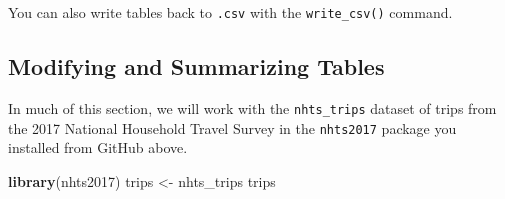 \documentclass[]{book}
\newenvironment{Shaded}{\begin{snugshade}}{\end{snugshade}}
\newcommand{\KeywordTok}[1]{\textcolor[rgb]{0.13,0.29,0.53}{\textbf{#1}}}
\newcommand{\NormalTok}[1]{#1}
\newcommand{\StringTok}[1]{\textcolor[rgb]{0.31,0.60,0.02}{#1}}
\begin{document}
You can also write tables back to \texttt{.csv} with the \texttt{write\_csv()} command.

\hypertarget{modifying-and-summarizing-tables}{%
\subsection{Modifying and Summarizing Tables}\label{modifying-and-summarizing-tables}}

In much of this section, we will work with the \texttt{nhts\_trips} dataset of trips
from the 2017 National Household Travel Survey in the \texttt{nhts2017} package you
installed from GitHub above.

\begin{Shaded}
\begin{Highlighting}[]
\KeywordTok{library}\NormalTok{(nhts2017)}
\NormalTok{trips <-}\StringTok{ }\NormalTok{nhts_trips}
\NormalTok{trips}
\end{Highlighting}
\end{Shaded}
\end{document}
